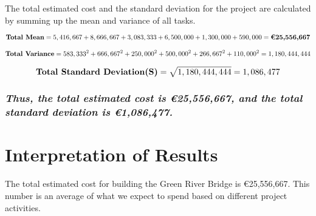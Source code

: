 \documentclass{article}
\begin{document}
The total estimated cost and the standard deviation for the project are calculated by summing up the mean and variance of all tasks.
\begin{table}[h!]
\centering
{}
\caption{Three-Point Estimate Calculations for Green River Bridge}
\end{table}
\[
\text{\textbf{Total Mean}} = 5,416,667 + 8,666,667 + 3,083,333 + 6,500,000 + 1,300,000 + 590,000 = \textbf{€25,556,667}
\]

\[
\text{\textbf{Total Variance}} = 583,333^2 + 666,667^2 + 250,000^2 + 500,000^2 + 266,667^2 + 110,000^2 = 1,180,444,444
\]

\[
\text{\textbf{Total Standard Deviation(S)}} = \sqrt{1,180,444,444} = 1,086,477
\]


\subsubsection*{\textit{Thus, the total estimated cost is \textbf{€25,556,667}, and the total standard deviation is \textbf{€1,086,477}.}}

\section*{Interpretation of Results}
The total estimated cost for building the Green River Bridge is €25,556,667. This number is an average of what we expect to spend based on different project activities.
\end{document}
